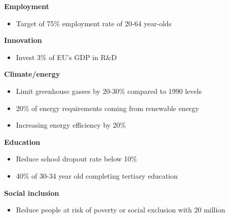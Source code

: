 \documentclass{beamer}
\begin{document}
\begin{frame}  
  \textbf{Employment}
  \begin{itemize}
    \item Target of 75\% employment rate of 20-64 year-olds
  \end{itemize}

  \textbf{Innovation}
  \begin{itemize}
    \item Invest 3\% of EU's GDP in R\&D
  \end{itemize}
  
  \textbf{Climate/energy}
  \begin{itemize}
    \item Limit greenhouse gasses by 20-30\% compared to 1990 levels
    \item 20\% of energy requirements coming from renewable energy
    \item Increasing energy efficiency by 20\%
  \end{itemize}
  
  \textbf{Education}
  \begin{itemize}
    \item Reduce school dropout rate below 10\%
    \item 40\% of 30-34 year old completing tertiary education
  \end{itemize}
  
  \textbf{Social inclusion}
  \begin{itemize}  
    \item Reduce people at risk of poverty or social exclusion with 20 million
  \end{itemize}
\end{frame}

\end{document}
